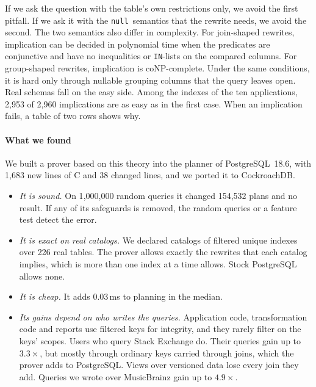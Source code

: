\documentclass[conference]{IEEEtran}
\theoremstyle{definition}
\newcommand{\sql}[1]{\texttt{#1}}
\newcommand{\nul}{\texttt{null}}
\begin{document}
If we ask the question with the table's own restrictions only, we avoid the first pitfall. If we ask it with the
\nul\ semantics that the rewrite needs, we avoid the second. The two semantics also differ in complexity. For
join-shaped rewrites, implication can be decided in polynomial time when the predicates are conjunctive and have no
inequalities or \sql{IN}-lists on the compared columns. For group-shaped rewrites, implication is coNP-complete. Under
the same conditions, it is hard only through nullable grouping columns that the query leaves open. Real schemas fall
on the easy side. Among the indexes of the ten applications, 2{,}953 of 2{,}960 implications are as easy as in the
first case. When an implication fails, a table of two rows shows why.

\paragraph*{What we found} We built a prover based on this theory into the planner of PostgreSQL~18.6, with 1{,}683
new lines of C and 38 changed lines, and we ported it to CockroachDB.
\begin{itemize}
\item \emph{It is sound.} On 1{,}000{,}000 random queries it changed 154{,}532 plans and no result. If any of its
  safeguards is removed, the random queries or a feature test detect the error.
\item \emph{It is exact on real catalogs.} We declared catalogs of filtered unique indexes over 226 real tables. The
  prover allows exactly the rewrites that each catalog implies, which is more than one index at a time allows. Stock
  PostgreSQL allows none.
\item \emph{It is cheap.} It adds 0.03\,ms to planning in the median.
\item \emph{Its gains depend on who writes the queries.} Application code, transformation code and reports use filtered
  keys for integrity, and they rarely filter on the keys' scopes. Users who query Stack Exchange do. Their queries
  gain up to $3.3\times$, but mostly through ordinary keys carried through joins, which the prover adds to PostgreSQL.
  Views over versioned data lose every join they add. Queries we wrote over MusicBrainz gain up to $4.9\times$.
\end{itemize}
\end{document}
